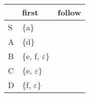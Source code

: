 \documentclass{standalone}
\providecommand\lightrule{%
	\arrayrulecolor{black!30}%
	\midrule[\lightrulewidth]%
	\arrayrulecolor{black}}
\begin{document}
\begin{tabularx}{\textwidth}{XXX}
    & first & follow\\
    \midrule
        S
        &
        \{a\}
        &
        \\ \lightrule
        A
        &
        \{d\}
        &
        \\ \lightrule
        B
        &
        \{e, f, \(\varepsilon\)\}
        &
        \\ \lightrule
        C
        &
        \{e, \(\varepsilon\)\}
        &
        \\ \lightrule
        D
        &
        \{f, \(\varepsilon\)\}
        &
        
\end{tabularx}
\end{document}
